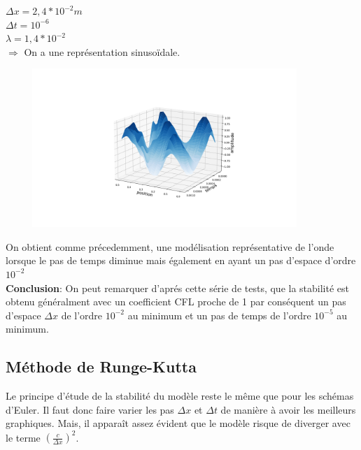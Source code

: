 \begin{enumerate}[label=\alph*)]
\begin{minipage}{.45\textwidth}%

\item $\Delta x=2,4*{10}^{-2}m$ \\
$\Delta t= {10}^{-6}$ \\
$\lambda=1,4*{10}^{-2} $\\


$\Longrightarrow$ On a une représentation sinusoïdale. 
\end{minipage}%
\hfill
\begin{minipage}{.6\textwidth}%

\includegraphics[width=12cm,height=6cm]{dt=10^-6 avec dx=0.024.png}
\end{minipage}
On obtient comme précedemment, une modélisation représentative de l'onde lorsque le pas de temps diminue mais également en ayant un pas d'espace d'ordre ${10}^{-2}$\\


\textbf{Conclusion}: On peut remarquer d'aprés cette série de tests, que la stabilité est obtenu généralment avec un coefficient CFL proche de 1 par conséquent un pas d'espace $\Delta x$ de l'ordre ${10}^{-2}$ au minimum et un pas de temps de l'ordre ${10}^{-5}$ au minimum.   


\end{enumerate}

\subsection{Méthode de Runge-Kutta}
Le principe d'étude de la stabilité du modèle reste le même que pour les schémas d'Euler. Il faut donc faire varier les pas $\Delta x$ et $\Delta t$ de manière à avoir les meilleurs graphiques.
Mais, il apparaît assez évident que le modèle risque de diverger avec le terme $(\frac{c}{\Delta x})^2$.\\

